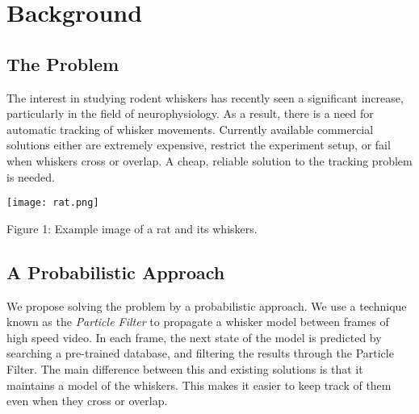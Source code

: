\section*{Background}
\subsection*{The Problem}
The interest in studying rodent whiskers has recently seen a significant increase, particularly in the field of neurophysiology. As a result, there is a need for automatic tracking of whisker movements. Currently available commercial solutions either are extremely expensive, restrict the experiment setup, or fail when whiskers cross or overlap. A cheap, reliable solution to the tracking problem is needed.

\begin{center}
  \texttt{[image: rat.png]}
  \label{fig:rat}
  
  Figure 1: Example image of a rat and its whiskers.
\end{center}

\subsection*{A Probabilistic Approach}
We propose solving the problem by a probabilistic approach. We use a technique known as the \emph{Particle Filter} to propagate a whisker model between frames of high speed video. In each frame, the next state of the model is predicted by searching a pre-trained database, and filtering the results through the Particle Filter. The main difference between this and existing solutions is that it maintains a model of the whiskers. This makes it easier to keep track of them even when they cross or overlap.
